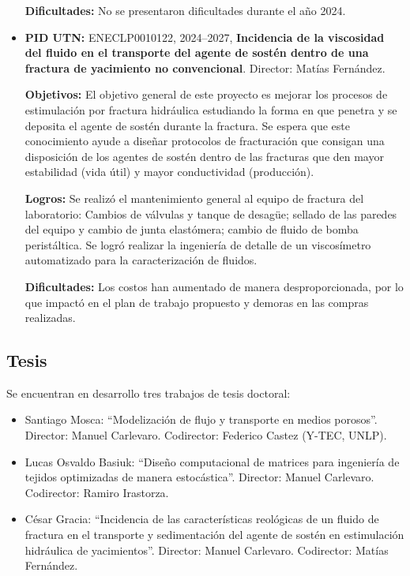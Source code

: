 \documentclass[a4paper,11pt,twoside,final,titlepage,onecolumn,openright]{report}
\begin{document}
\begin{itemize}
    \textbf{Dificultades:} No se presentaron dificultades durante el año 2024.

  \item \textbf{PID UTN:} ENECLP0010122, 2024--2027, \textbf{Incidencia de la viscosidad del fluido en el transporte del agente de sostén dentro de una fractura de yacimiento no convencional}. Director: Matías Fernández.

    \textbf{Objetivos:} El objetivo general de este proyecto es mejorar los procesos de estimulación por fractura hidráulica estudiando la forma en que penetra y se deposita el agente de sostén durante la fractura. Se espera que este conocimiento ayude a diseñar protocolos de fracturación que consigan una disposición de los agentes de sostén dentro de las fracturas que den mayor estabilidad (vida útil) y mayor conductividad (producción).

    \textbf{Logros:} Se realizó el mantenimiento general al equipo de fractura del laboratorio: Cambios de válvulas y tanque de desagüe; sellado de las paredes del equipo y cambio de junta elastómera; cambio de fluido de bomba peristáltica. Se logró realizar la ingeniería de detalle de un viscosímetro automatizado para la caracterización de fluidos.

    \textbf{Dificultades:} Los costos han aumentado de manera desproporcionada, por lo que impactó en el plan de trabajo propuesto y demoras en las compras realizadas.

\end{itemize}

\subsection{Tesis}

Se encuentran en desarrollo tres trabajos de tesis doctoral:
\begin{itemize}
 \item Santiago Mosca: ``Modelización de flujo y transporte en medios porosos''. Director: Manuel Carlevaro. Codirector: Federico Castez (Y-TEC, UNLP).
 \item Lucas Osvaldo Basiuk: ``Diseño computacional de matrices para ingeniería de tejidos optimizadas de manera estocástica''. Director: Manuel Carlevaro. Codirector: Ramiro Irastorza.
\item César Gracia: ``Incidencia de las características reológicas de un fluido de fractura en el transporte y sedimentación del agente de sostén en estimulación hidráulica de yacimientos''. Director: Manuel Carlevaro. Codirector: Matías Fernández.
\end{itemize}
\end{document}

